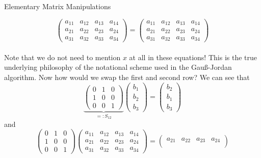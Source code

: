 \documentclass[smaller,hyperref={CJKbookmarks=true}]{beamer}
\begin{document}
\begin{frame}{Elementary Matrix Manipulations}
\begin{spacing}{1}
\[\begin{pmatrix}
                 a_{11} & a_{12} & a_{13} & a_{14}\\
                 a_{21} & a_{22} & a_{23} & a_{24}\\
                 a_{31} & a_{32} & a_{33} & a_{34}
               \end{pmatrix}=\begin{pmatrix}
                 a_{11} & a_{12} & a_{13} & a_{14}\\
                 a_{21} & a_{22} & a_{23} & a_{24}\\
                 a_{31} & a_{32} & a_{33} & a_{34}
               \end{pmatrix}\]
 \\[7pt]
Note that we do not need to mention $x$ at all in these equations! This is
the true underlying philosophy of the notational scheme used in the
Gau\ss-Jordan algorithm.
\newpage
Now how would we swap the first and second row? We can see that
\[\underbrace{\begin{pmatrix}
    0 & 1 & 0 \\
    1 & 0 & 0 \\
    0 & 0 & 1
  \end{pmatrix}}_{=:S_{12}}\begin{pmatrix}
                 b_1 \\
                 b_2 \\
                 b_3
               \end{pmatrix}=\begin{pmatrix}
                               b_2 \\
                               b_1 \\
                               b_3
                             \end{pmatrix}\]
and\\[7pt]
\[\begin{pmatrix}
    0 & 1 & 0 \\
    1 & 0 & 0 \\
    0 & 0 & 1
  \end{pmatrix}\begin{pmatrix}
                 a_{11} & a_{12} & a_{13} & a_{14}\\
                 a_{21} & a_{22} & a_{23} & a_{24}\\
                 a_{31} & a_{32} & a_{33} & a_{34}
               \end{pmatrix}=\begin{pmatrix}
                 a_{21} & a_{22} & a_{23} & a_{24}\\

\end{pmatrix}\]
\end{spacing}
\end{frame}
\end{document}
